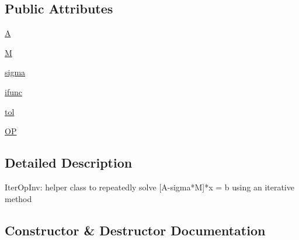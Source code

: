 \subsection*{Public Attributes}
\begin{DoxyCompactItemize}
\item 
\hyperlink{classscipy_1_1sparse_1_1linalg_1_1eigen_1_1arpack_1_1arpack_1_1IterOpInv_af455860a1c18f2995b347e87d24e3ffa}{A}
\item 
\hyperlink{classscipy_1_1sparse_1_1linalg_1_1eigen_1_1arpack_1_1arpack_1_1IterOpInv_aa707e77154ddfd62ee69db723b3a680f}{M}
\item 
\hyperlink{classscipy_1_1sparse_1_1linalg_1_1eigen_1_1arpack_1_1arpack_1_1IterOpInv_aa78fead84d8f4b8d2d6bba3e1d098060}{sigma}
\item 
\hyperlink{classscipy_1_1sparse_1_1linalg_1_1eigen_1_1arpack_1_1arpack_1_1IterOpInv_aa5c69a909143ceb5ffa630fb8104ea3e}{ifunc}
\item 
\hyperlink{classscipy_1_1sparse_1_1linalg_1_1eigen_1_1arpack_1_1arpack_1_1IterOpInv_abda18646c7133749aa9a13f3b4b07237}{tol}
\item 
\hyperlink{classscipy_1_1sparse_1_1linalg_1_1eigen_1_1arpack_1_1arpack_1_1IterOpInv_a93191db684e2faca0b5e90befb51fae3}{O\+P}
\end{DoxyCompactItemize}


\subsection{Detailed Description}
\begin{DoxyVerb}IterOpInv:
   helper class to repeatedly solve [A-sigma*M]*x = b
   using an iterative method
\end{DoxyVerb}
 

\subsection{Constructor \& Destructor Documentation}
\hypertarget{classscipy_1_1sparse_1_1linalg_1_1eigen_1_1arpack_1_1arpack_1_1IterOpInv_ad2e42304962011fa43b0b7ebe6694091}{}
